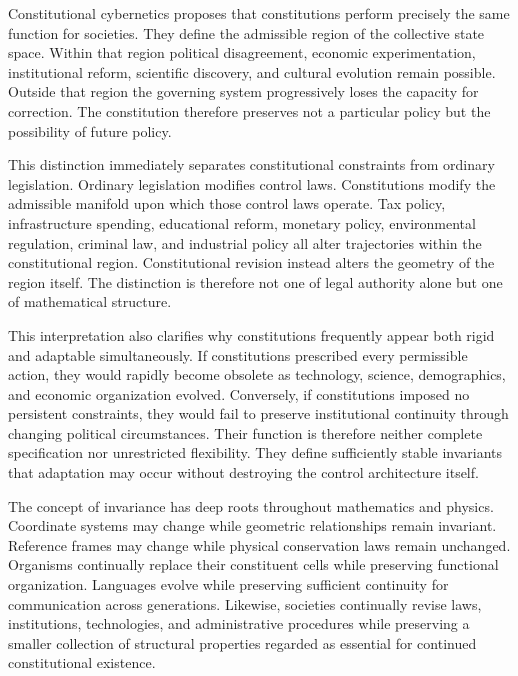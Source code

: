 \documentclass[12pt,a4paper]{article}
\begin{document}
Constitutional cybernetics proposes that constitutions perform precisely the same function for societies. They define the admissible region of the collective state space. Within that region political disagreement, economic experimentation, institutional reform, scientific discovery, and cultural evolution remain possible. Outside that region the governing system progressively loses the capacity for correction. The constitution therefore preserves not a particular policy but the possibility of future policy.

This distinction immediately separates constitutional constraints from ordinary legislation. Ordinary legislation modifies control laws. Constitutions modify the admissible manifold upon which those control laws operate. Tax policy, infrastructure spending, educational reform, monetary policy, environmental regulation, criminal law, and industrial policy all alter trajectories within the constitutional region. Constitutional revision instead alters the geometry of the region itself. The distinction is therefore not one of legal authority alone but one of mathematical structure.

This interpretation also clarifies why constitutions frequently appear both rigid and adaptable simultaneously. If constitutions prescribed every permissible action, they would rapidly become obsolete as technology, science, demographics, and economic organization evolved. Conversely, if constitutions imposed no persistent constraints, they would fail to preserve institutional continuity through changing political circumstances. Their function is therefore neither complete specification nor unrestricted flexibility. They define sufficiently stable invariants that adaptation may occur without destroying the control architecture itself.

The concept of invariance has deep roots throughout mathematics and physics. Coordinate systems may change while geometric relationships remain invariant. Reference frames may change while physical conservation laws remain unchanged. Organisms continually replace their constituent cells while preserving functional organization. Languages evolve while preserving sufficient continuity for communication across generations. Likewise, societies continually revise laws, institutions, technologies, and administrative procedures while preserving a smaller collection of structural properties regarded as essential for continued constitutional existence.
\end{document}
